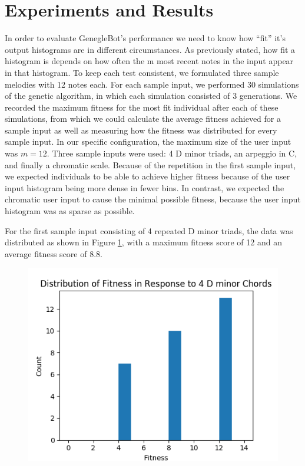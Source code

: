 \documentclass[conference]{IEEEtran}
\begin{document}
\section{Experiments and Results}

    In order to evaluate GenegleBot’s performance we need to know how “fit” it’s output histograms are in different circumstances.  As previously stated, how fit a histogram is depends on how often the m most recent notes in the input appear in that histogram.  To keep each test consistent, we formulated three sample melodies with 12 notes each.  For each sample input, we performed 30 simulations of the genetic algorithm, in which each simulation consisted of 3 generations. We recorded the maximum fitness for the most fit individual after each of these simulations, from which we could calculate the average fitness achieved for a sample input as well as measuring how the fitness was distributed for every sample input. In our specific configuration, the maximum size of the user input was $ m=12 $. 
Three sample inputs were used: 4 D minor triads, an arpeggio in C, and finally a chromatic scale. Because of the repetition in the first sample input, we expected individuals to be able to achieve higher fitness because of the user input histogram being more dense in fewer bins. In contrast, we expected the chromatic user input to cause the minimal possible fitness, because the user input histogram was as sparse as possible. 

For the first sample input consisting of 4 repeated D minor triads, the data was distributed as shown in Figure \ref{fig:dminordist}, with a maximum fitness score of 12 and an average fitness score of 8.8. 


\begin{figure}[H]
	\centering
	\includegraphics[width=0.7\linewidth]{dMinorDist}
	\caption{}
	\label{fig:dminordist}
\end{figure}
\end{document}

